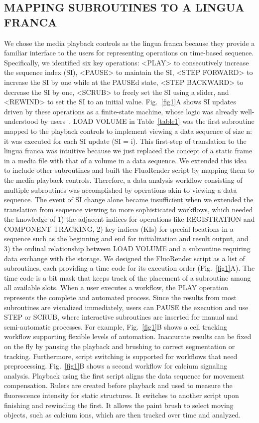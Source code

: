 \documentclass{IEEEcsmag}
\begin{document}
\subsection{MAPPING SUBROUTINES TO A LINGUA FRANCA}

We chose the media playback controls as the lingua franca because they provide a familiar interface to the users for representing operations on time-based sequence. Specifically, we identified six key operations: <PLAY> to consecutively increase the sequence index (SI), <PAUSE> to maintain the SI, <STEP FORWARD> to increase the SI by one while at the PAUSEd state, <STEP BACKWARD> to decrease the SI by one, <SCRUB> to freely set the SI using a slider, and <REWIND> to set the SI to an initial value. Fig.~\ref{fig1}A shows SI updates driven by these operations as a finite-state machine, whose logic was already well-understood by users~\cite{seven}. LOAD VOLUME in Table~\ref{table1} was the first subroutine mapped to the playback controls to implement viewing a data sequence of size n: it was executed for each SI update (SI = i). This first-step of translation to the lingua franca was intuitive because we just replaced the concept of a static frame in a media file with that of a volume in a data sequence. We extended this idea to include other subroutines and built the FluoRender script by mapping them to the media playback controls. Therefore, a data analysis workflow consisting of multiple subroutines was accomplished by operations akin to viewing a data sequence.
The event of SI change alone became insufficient when we extended the translation from sequence viewing to more sophisticated workflows, which needed the knowledge of 1) the adjacent indices for operations like REGISTRATION and COMPONENT TRACKING, 2) key indices (KIs) for special locations in a sequence such as the beginning and end for initialization and result output, and 3) the ordinal relationship between LOAD VOLUME and a subroutine requiring data exchange with the storage. We designed the FluoRender script as a list of subroutines, each providing a time code for its execution order (Fig.~\ref{fig1}A). The time code is a bit mask that keeps track of the placement of a subroutine among all available slots. When a user executes a workflow, the PLAY operation represents the complete and automated process. Since the results from most subroutines are visualized immediately, users can PAUSE the execution and use STEP or SCRUB, where interactive subroutines are inserted for manual and semi-automatic processes. For example, Fig.~\ref{fig1}B shows a cell tracking workflow supporting flexible levels of automation. Inaccurate results can be fixed on the fly by pausing the playback and brushing to correct segmentation or tracking. Furthermore, script switching is supported for workflows that need preprocessing. Fig.~\ref{fig1}B shows a second workflow for calcium signaling analysis. Playback using the first script aligns the data sequence for movement compensation. Rulers are created before playback and used to measure the fluorescence intensity for static structures. It switches to another script upon finishing and rewinding the first. It allows the paint brush to select moving objects, such as calcium ions, which are then tracked over time and analyzed.
\end{document}
